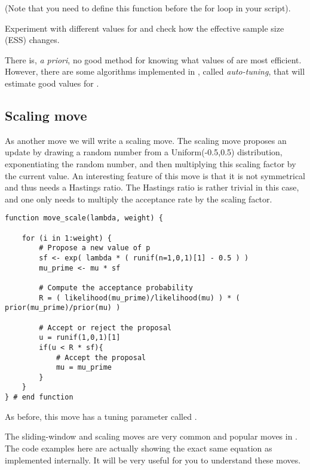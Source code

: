 (Note that you need to define this function before the for loop in your script).

{\begin{framed}
Experiment with different values for  and check how the effective sample size (ESS) changes.
\end{framed}}

There is, {\it a priori}, no good method for knowing what values of  are most efficient.
However, there are some algorithms implemented in \RevBayes, called \emph{auto-tuning}, that will estimate good values for .

\subsection{Scaling move}
As another move we will write a scaling move.
The scaling move proposes an update by drawing a random number from a Uniform(-0.5,0.5) distribution, exponentiating the random number, and then multiplying this scaling factor by the current value.
An interesting feature of this move is that it is not symmetrical and thus needs a Hastings ratio.
The Hastings ratio is rather trivial in this case, and one only needs to multiply the acceptance rate by the scaling factor.
{\tt \begin{snugshade*}
\begin{lstlisting}    
function move_scale(lambda, weight) {

    for (i in 1:weight) {
        # Propose a new value of p
        sf <- exp( lambda * ( runif(n=1,0,1)[1] - 0.5 ) )
        mu_prime <- mu * sf

        # Compute the acceptance probability
        R = ( likelihood(mu_prime)/likelihood(mu) ) * ( prior(mu_prime)/prior(mu) ) 

        # Accept or reject the proposal
        u = runif(1,0,1)[1] 
        if(u < R * sf){
            # Accept the proposal
            mu = mu_prime 
        }
    }
} # end function
\end{lstlisting}
\end{snugshade*}}
As before, this move has a tuning parameter called .

\begin{framed}
\IMPORANT The sliding-window and scaling moves are very common and popular moves in \RevBayes.
The code examples here are actually showing the exact same equation as implemented internally.
It will be very useful for you to understand these moves.	
\end{framed}


